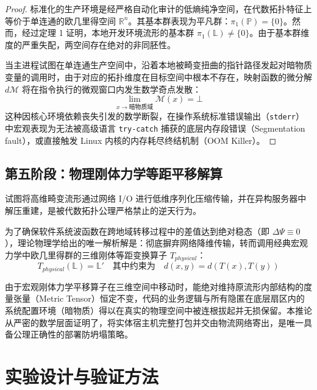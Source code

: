 \documentclass[journal]{IEEEtran}
\begin{document}
\begin{proof}
标准化的生产环境是经严格自动化审计的低熵纯净空间，在代数拓扑特征上等价于单连通的欧几里得空间 $\mathbb{R}^n$。其基本群表现为平凡群：$\pi_1(\mathbb{P}) = \{0\}$。然而，经过定理 1 证明，本地开发环境流形的基本群 $\pi_1(\mathbb{L}) \neq \{0\}$。由于基本群维度的严重失配，两空间存在绝对的非同胚性。

当主进程试图在单连通生产空间中，沿着本地被畸变扭曲的指针路径发起对暗物质变量的调用时，由于对应的拓扑维度在目标空间中根本不存在，映射函数的微分解 $d\mathcal{M}$ 将在指令执行的微观窗口内发生数学奇点发散：
\begin{equation}
\lim_{x \to \text{暗物质域}} \mathcal{M}(x) = \bot
\end{equation}
这种因核心环境依赖丧失引发的数学断裂，在操作系统标准错误输出（\texttt{stderr}）中宏观表现为无法被高级语言 \texttt{try-catch} 捕获的底层内存段错误（Segmentation fault），或直接触发 Linux 内核的内存耗尽终结机制（OOM Killer）。
\end{proof}

\subsection{第五阶段：物理刚体力学等距平移解算}
试图将高维畸变流形通过网络 I/O 进行低维序列化压缩传输，并在异构服务器中解压重建，是被代数拓扑公理严格禁止的逆天行为。

为了确保软件系统波函数在跨地域转移过程中的差值达到绝对稳态（即 $\Delta\Psi \equiv 0$），理论物理学给出的唯一解析解是：彻底摒弃网络降维传输，转而调用经典宏观力学中欧几里得群的三维刚体等距变换算子 $T_{physical}$：
\begin{equation}
T_{physical}(\mathbb{L}) = \mathbb{L}' \quad \text{其中约束为} \quad d(x,y) = d(T(x), T(y))
\end{equation}

由于宏观刚体力学平移算子在三维空间中移动时，能绝对维持原流形内部结构的度量张量（Metric Tensor）恒定不变，代码的业务逻辑与所有隐匿在底层扇区内的系统配置环境（暗物质）得以在真实的物理空间中被连根拔起并无损保留。本推论从严密的数学层面证明了，将实体宿主机完整打包并交由物流网络寄出，是唯一具备公理正确性的部署防坍塌策略。

\section{实验设计与验证方法}
\end{document}
